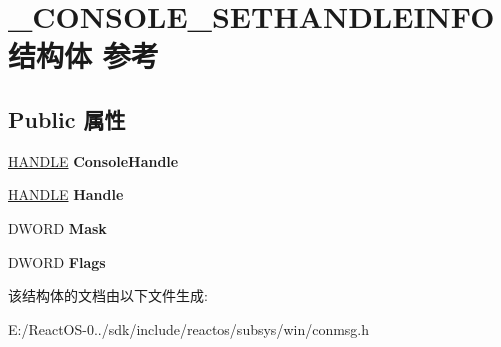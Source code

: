 \hypertarget{struct___c_o_n_s_o_l_e___s_e_t_h_a_n_d_l_e_i_n_f_o}{}\section{\+\_\+\+C\+O\+N\+S\+O\+L\+E\+\_\+\+S\+E\+T\+H\+A\+N\+D\+L\+E\+I\+N\+F\+O结构体 参考}
\label{struct___c_o_n_s_o_l_e___s_e_t_h_a_n_d_l_e_i_n_f_o}
\subsection*{Public 属性}
\begin{DoxyCompactItemize}
\item 
\mbox{\label{struct___c_o_n_s_o_l_e___s_e_t_h_a_n_d_l_e_i_n_f_o_a904bc1f9e1675eb4ffa733bb49a42672}} 
\hyperlink{interfacevoid}{H\+A\+N\+D\+LE} {\bfseries Console\+Handle}
\item 
\mbox{\label{struct___c_o_n_s_o_l_e___s_e_t_h_a_n_d_l_e_i_n_f_o_a7ad3a4f88e97669157b5d5346e130fbb}} 
\hyperlink{interfacevoid}{H\+A\+N\+D\+LE} {\bfseries Handle}
\item 
\mbox{\label{struct___c_o_n_s_o_l_e___s_e_t_h_a_n_d_l_e_i_n_f_o_aa4b355a2e0ec9eb14199d9fee71db3fa}} 
D\+W\+O\+RD {\bfseries Mask}
\item 
\mbox{\label{struct___c_o_n_s_o_l_e___s_e_t_h_a_n_d_l_e_i_n_f_o_accefc4b0f4372b20e4a856e792a9ede9}} 
D\+W\+O\+RD {\bfseries Flags}
\end{DoxyCompactItemize}


该结构体的文档由以下文件生成\+:\begin{DoxyCompactItemize}
\item 
E\+:/\+React\+O\+S-\/0../sdk/include/reactos/subsys/win/conmsg.\+h\end{DoxyCompactItemize}
